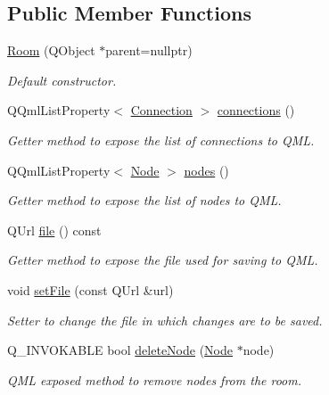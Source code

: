 \subsection*{Public Member Functions}
\begin{DoxyCompactItemize}
\item 
\mbox{\hyperlink{classRoom_a58d54cc7a80930812d780f101c1dc4bc}{Room}} (Q\+Object $\ast$parent=nullptr)
\begin{DoxyCompactList}\small\item\em Default constructor. \end{DoxyCompactList}\item 
Q\+Qml\+List\+Property$<$ \mbox{\hyperlink{classConnection}{Connection}} $>$ \mbox{\hyperlink{classRoom_a95230e582f089891ea8a8f6febfaf2fa}{connections}} ()
\begin{DoxyCompactList}\small\item\em Getter method to expose the list of connections to Q\+ML. \end{DoxyCompactList}\item 
Q\+Qml\+List\+Property$<$ \mbox{\hyperlink{classNode}{Node}} $>$ \mbox{\hyperlink{classRoom_a9ed01ab71422acf2c22b46d7f582f878}{nodes}} ()
\begin{DoxyCompactList}\small\item\em Getter method to expose the list of nodes to Q\+ML. \end{DoxyCompactList}\item 
Q\+Url \mbox{\hyperlink{classRoom_ab6644a3874458fbeffd5fa2951d281ab}{file}} () const
\begin{DoxyCompactList}\small\item\em Getter method to expose the file used for saving to Q\+ML. \end{DoxyCompactList}\item 
void \mbox{\hyperlink{classRoom_afe61f8f1359a431ef906ee2ff485eb80}{set\+File}} (const Q\+Url \&url)
\begin{DoxyCompactList}\small\item\em Setter to change the file in which changes are to be saved. \end{DoxyCompactList}\item 
Q\+\_\+\+I\+N\+V\+O\+K\+A\+B\+LE bool \mbox{\hyperlink{classRoom_adbcc976eefed696d0536773e75c4f7d2}{delete\+Node}} (\mbox{\hyperlink{classNode}{Node}} $\ast$node)
\begin{DoxyCompactList}\small\item\em Q\+ML exposed method to remove nodes from the room. \end{DoxyCompactList}\item 

\end{DoxyCompactItemize}
